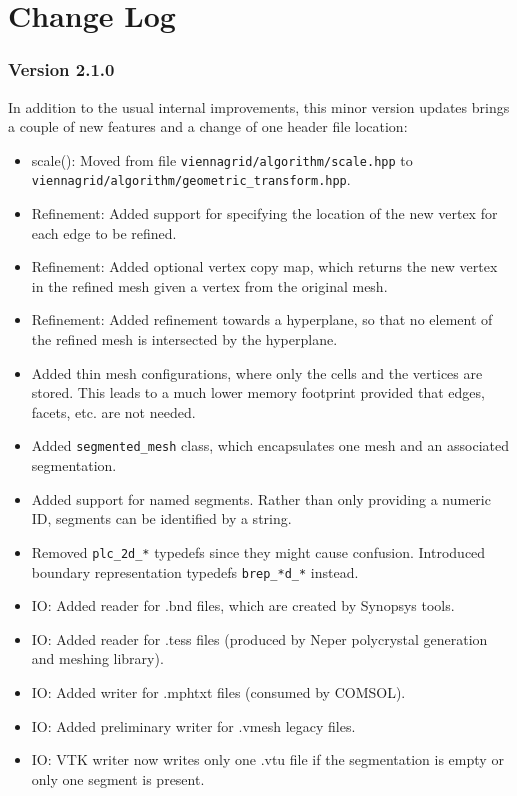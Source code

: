 
\chapter{Change Log}

\subsection*{Version 2.1.0}
In addition to the usual internal improvements, this minor version updates brings a couple of new features and a change of one header file location:
\begin{itemize}
 \item scale(): Moved from file \lstinline|viennagrid/algorithm/scale.hpp| to \lstinline|viennagrid/algorithm/geometric_transform.hpp|.
 \item Refinement: Added support for specifying the location of the new vertex for each edge to be refined.
 \item Refinement: Added optional vertex copy map, which returns the new vertex in the refined mesh given a vertex from the original mesh.
 \item Refinement: Added refinement towards a hyperplane, so that no element of the refined mesh is intersected by the hyperplane.
 \item Added thin mesh configurations, where only the cells and the vertices are stored. This leads to a much lower memory footprint provided that edges, facets, etc. are not needed.
 \item Added \lstinline|segmented_mesh| class, which encapsulates one mesh and an associated segmentation.
 \item Added support for named segments. Rather than only providing a numeric ID, segments can be identified by a string.
 \item Removed \lstinline|plc_2d_*| typedefs since they might cause confusion. Introduced boundary representation typedefs \lstinline|brep_*d_*| instead.
 \item IO: Added reader for .bnd files, which are created by Synopsys tools.
 \item IO: Added reader for .tess files (produced by Neper polycrystal generation and meshing library).
 \item IO: Added writer for .mphtxt files (consumed by COMSOL).
 \item IO: Added preliminary writer for .vmesh legacy files.
 \item IO: VTK writer now writes only one .vtu file if the segmentation is empty or only one segment is present.

\end{itemize}
